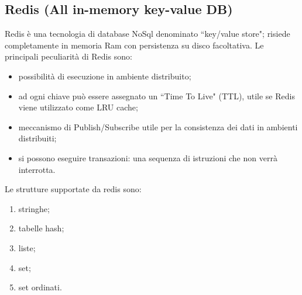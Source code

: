 \subsection{Redis (All in-memory key-value DB)}
Redis è una tecnologia di database NoSql denominato ``key/value store"; risiede completamente in memoria Ram con persistenza su disco facoltativa. Le principali peculiarità di Redis sono:
\begin{itemize}
	\item possibilità di esecuzione in ambiente distribuito;
	\item ad ogni chiave può essere assegnato un ``Time To Live" (TTL), utile se Redis viene utilizzato come LRU cache;
	\item meccanismo di Publish/Subscribe utile per la consistenza dei dati in ambienti distribuiti;
	\item si possono eseguire transazioni: una sequenza di istruzioni che non verrà interrotta.
	
\end{itemize}
Le strutture supportate da redis sono:
\begin{enumerate}
	\item stringhe;
	\item tabelle hash;
	\item liste;
	\item set;
	\item set ordinati.
\end{enumerate}

